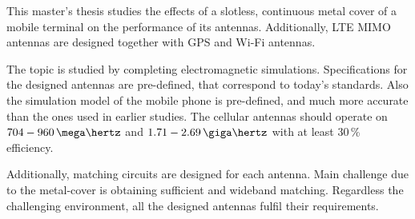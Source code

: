  
This master's thesis studies the effects of a slotless, continuous metal cover of a mobile terminal on the performance of its antennas. Additionally, LTE MIMO antennas are designed together with GPS and Wi-Fi antennas.

The topic is studied by completing electromagnetic simulations. Specifications for the designed antennas are pre-defined, that correspond to today's standards. Also the simulation model of the mobile phone is pre-defined, and much more accurate than the ones used in earlier studies. The cellular antennas should operate on $704-960\,\mega\hertz$ and $1.71-2.69\,\giga\hertz$ with at least 30\,\% efficiency.

Additionally, matching circuits are designed for each antenna. Main challenge due to the metal-cover is obtaining sufficient and wideband matching. Regardless the challenging environment, all the designed antennas fulfil their requirements.